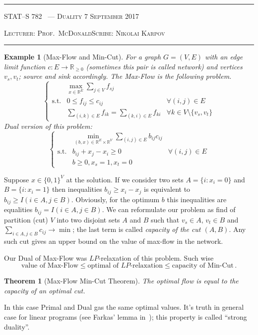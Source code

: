 \documentclass[10pt]{article}
\newcounter{lecnum}
\newtheorem{theorem}{Theorem}[lecnum]
\newtheorem{example}[ex]{Example}
\newcommand{\R}{\mathbb{R}}
\newcommand{\lecturer}{Prof.\ McDonald}
\newcommand{\scribe}{Nikolai Karpov}
\newcommand{\chtitle}{Duality}
\newcommand{\lecdate}{7 September 2017}
\begin{document}
\rule{6.5in}{1pt}

\textsc{STAT--S 782
        \hfill \thelecnum\ --- \chtitle
        \hfill \lecdate}

\textsc{Lecturer: \lecturer \hfill Scribe: \scribe}
\rule{6.5in}{1pt}

\begin{example}[Max-Flow and Min-Cut]
	For a graph $G = (V, E)$ with an edge limit function $c : E \rightarrow \R_{\geq 0}$ (sometimes this pair is called network) and vertices $v_s, v_t$; source and sink
	accordingly. The Max-Flow is the following problem.
	\[\left\{
	\begin{array}{lll}
	& \max\limits_{x \in \R^E} {\sum\limits_{j \in V}f_{sj}} \\
	\text{s.t.} &  0 \leq f_{ij} \leq c_{ij} & \forall (i, j) \in E \\
	& \sum\limits_{(i, k) \in E} f_{ik} = \sum\limits_{(k, i) \in E} f_{ki} & \forall k \in V \setminus \{v_s, v_t\}
	\end{array}
	\right.
	\]
	Dual version of this problem:
	\[
	\left\{
	\begin{array}{lll}
	&\min\limits_{(b, x) \in \R^E\times \R^V}\sum\limits_{(i, j) \in E}b_{ij}c_{ij} \\
	\text{s.t.} & b_{ij}+x_j-x_i \geq 0 & \forall (i, j) \in E \\
	& b \geq 0, x_s = 1, x_t = 0
	\end{array}
	\right.
	\]
\end{example}
	Suppose $x \in \{0, 1\}^V$ at the solution. If we consider two sets
	$A = \{i : x_i = 0\}$ and $B = \{i : x_i = 1\}$ then inequalities
	$b_{ij} \geq x_i - x_j$ is equivalent to $b_{ij} \geq I(i \in A, j \in B)$. Obviously, for the optimum $b$ this inequalities are equalities $b_{ij} = I(i \in A, j \in B)$. We can reformulate our problem as find of partition (cut) $V$ into two disjoint sets $A$ and $B$ such that $v_s \in A$, $v_t \in B$ and $\sum\limits_{i \in A, j \in B}c_{ij} \rightarrow \min$; the last term is called \emph{capacity of the cut $(A, B)$}. Any such cut gives an upper bound on the value of max-flow in the network.
	
	Our Dual of Max-Flow was $LP$-relaxation of this problem. Such wise $$\text{value of Max-Flow} \leq \text{optimal of }LP\text{-relaxation} \leq \text{capacity of Min-Cut}\,.$$
	\begin{theorem}[Max-Flow Min-Cut Theorem] The optimal flow is equal to the capacity of an optimal cut.
	\end{theorem}
	In this case Primal and Dual gas the same optimal values. It's truth in general case for linear programs (see Farkas' lemma in~\cite{boyd2004convex}); this property is called ``strong duality''.
\end{document}
